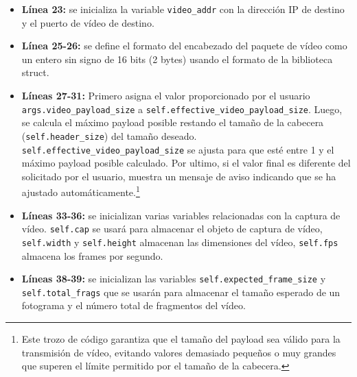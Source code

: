 \begin{itemize}
    \item \textbf{Línea 23:} se inicializa la variable \texttt{video\_addr} con la dirección IP de destino y el puerto de vídeo de destino.
    \item \textbf{Línea 25-26:} se define el formato del encabezado del paquete de vídeo como un entero sin signo de 16 bits (2 bytes) usando el formato de la biblioteca struct. 
    \item \textbf{Líneas 27-31:} Primero asigna el valor proporcionado por el usuario \texttt{args.video\_payload\_size} a \texttt{self.effective\_video\_payload\_size}. Luego, se calcula el máximo payload posible restando el tamaño de la cabecera (\texttt{self.header\_size}) del tamaño deseado. \\
    \texttt{self.effective\_video\_payload\_size} se ajusta para que esté entre 1 y el máximo payload posible calculado. Por ultimo, si el valor final es diferente del solicitado por el usuario, muestra un mensaje de aviso indicando que se ha ajustado automáticamente.\footnote{Este trozo de código garantiza que el tamaño del payload sea válido para la transmisión de vídeo, evitando valores demasiado pequeños o muy grandes que superen el límite permitido por el tamaño de la cabecera.}
    \item \textbf{Líneas 33-36:} se inicializan varias variables relacionadas con la captura de vídeo. \texttt{self.cap} se usará para almacenar el objeto de captura de vídeo, \texttt{self.width} y \texttt{self.height} almacenan las dimensiones del vídeo, \texttt{self.fps} almacena los frames por segundo.
    \item \textbf{Líneas 38-39:} se inicializan las variables \texttt{self.expected\_frame\_size} y \texttt{self.total\_frags} que se usarán para almacenar el tamaño esperado de un fotograma y el número total de fragmentos del vídeo.
\end{itemize}

\vspace{\baselineskip}

